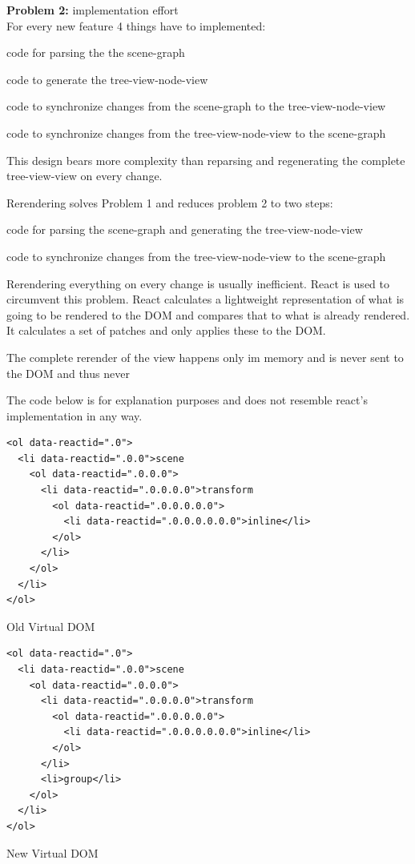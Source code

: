 \textbf{Problem 2:} implementation effort\\
For every new feature 4 things have to implemented:
\begin{enumerate*}
  \item code for parsing the the scene-graph
  \item code to generate the tree-view-node-view
  \item code to synchronize changes from the scene-graph to the tree-view-node-view
  \item code to synchronize changes from the tree-view-node-view to the scene-graph
\end{enumerate*}

This design bears more complexity than reparsing and regenerating the
complete tree-view-view on every change.

Rerendering solves Problem 1 and reduces problem 2 to two steps:
\begin{enumerate*}
  \item code for parsing the scene-graph and generating the tree-view-node-view
  \item code to synchronize changes from the tree-view-node-view to the scene-graph
\end{enumerate*}

Rerendering everything on every change is usually inefficient. React is
used to circumvent this problem. React calculates a lightweight
representation of what is going to be rendered to the DOM and compares
that to what is already rendered. It calculates a set of patches and
only applies these to the DOM.

The complete rerender of the view happens only im memory and is never
sent to the DOM and thus never

The code below is for explanation purposes and does not resemble react's
implementation in any way.

\begin{listing}[H]
  \begin{verbatim}
<ol data-reactid=".0">
  <li data-reactid=".0.0">scene
    <ol data-reactid=".0.0.0">
      <li data-reactid=".0.0.0.0">transform
        <ol data-reactid=".0.0.0.0.0">
          <li data-reactid=".0.0.0.0.0.0">inline</li>
        </ol>
      </li>
    </ol>
  </li>
</ol>
  \end{verbatim}
  \caption{Old Virtual DOM}
\end{listing}

\begin{listing}[H]
  \begin{verbatim}
<ol data-reactid=".0">
  <li data-reactid=".0.0">scene
    <ol data-reactid=".0.0.0">
      <li data-reactid=".0.0.0.0">transform
        <ol data-reactid=".0.0.0.0.0">
          <li data-reactid=".0.0.0.0.0.0">inline</li>
        </ol>
      </li>
      <li>group</li>
    </ol>
  </li>
</ol>
  \end{verbatim}
  \caption{New Virtual DOM}
\end{listing}


